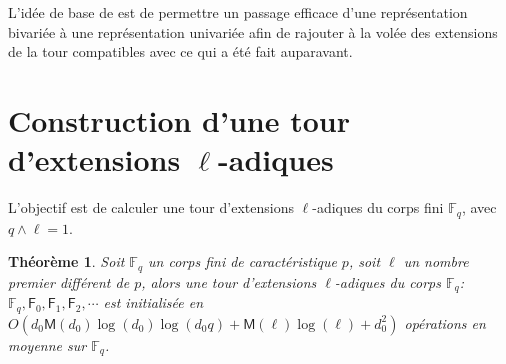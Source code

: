 \documentclass[10pt,a4paper]{book}
\theoremstyle{plain}
\newtheorem{thm}{Théorème}[chapter]
\theoremstyle{definition}
\theoremstyle{definition}
\theoremstyle{definition}
\theoremstyle{definition}
\theoremstyle{remark}
\theoremstyle{remark}
\theoremstyle{definition}
\begin{document}
L'idée de base de \cite{Doliskani-Schost15} est de permettre un passage efficace d'une représentation bivariée à une représentation univariée afin de rajouter à la volée des extensions de la tour compatibles avec ce qui a été fait auparavant.

\section{Construction d'une tour d'extensions $\ell$-adiques}
L'objectif est de calculer une tour d'extensions $\ell$-adiques du corps fini $\mathbb{F}_q$, avec $q \wedge \ell =1$. 

\begin{thm}
Soit $\mathbb{F}_q$ un corps fini de caractéristique $p$, soit $\ell$ un nombre premier différent de $p$,  alors une tour d'extensions $\ell$-adiques du corps $\mathbb{F}_q$: $\mathbb{F}_q, \mathsf{F}_0, \mathsf{F}_1, \mathsf{F}_2, \cdots$ est initialisée en $O(d_0\mathsf{M}(d_0)\log(d_0)\log(d_0q)+\mathsf{M}(\ell)\log(\ell)+d_0^2)$ opérations en moyenne sur $\mathbb{F}_q$.
\end{thm}
 
\end{document}
